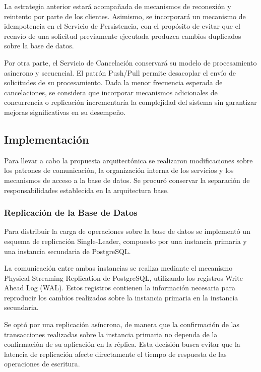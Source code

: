 \documentclass[conference]{IEEEtran}
\begin{document}
La estrategia anterior estará acompañada de mecanismos de reconexión y reintento 
por parte de los clientes. Asimismo, se incorporará un mecanismo de 
idempotencia en el Servicio de Persistencia, con el propósito de evitar 
que el reenvío de una solicitud previamente ejecutada produzca cambios 
duplicados sobre la base de datos.

Por otra parte, el Servicio de Cancelación conservará su modelo 
de procesamiento asíncrono y secuencial. El patrón Push/Pull 
permite desacoplar el envío de solicitudes de su procesamiento. 
Dada la menor frecuencia esperada de cancelaciones, se considera 
que incorporar mecanismos adicionales de concurrencia o replicación 
incrementaría la complejidad del sistema sin garantizar mejoras 
significativas en su desempeño.


\subsection{Implementación}

Para llevar a cabo la propuesta arquitectónica se realizaron modificaciones 
sobre los patrones de comunicación, la organización interna de los servicios 
y los mecanismos de acceso a la base de datos. Se procuró conservar la 
separación de responsabilidades establecida en la arquitectura base.

\subsubsection{Replicación de la Base de Datos}

Para distribuir la carga de operaciones sobre la base de datos se 
implementó un esquema de replicación Single-Leader, compuesto por una 
instancia primaria y una instancia secundaria de PostgreSQL.

La comunicación entre ambas instancias se realiza mediante el mecanismo 
Physical Streaming Replication de PostgreSQL, utilizando los registros 
Write-Ahead Log (WAL). Estos registros contienen la información necesaria 
para reproducir los cambios realizados sobre la instancia primaria en 
la instancia secundaria.

Se optó por una replicación asíncrona, de manera que la confirmación 
de las transacciones realizadas sobre la instancia primaria no dependa 
de la confirmación de su aplicación en la réplica. Esta decisión busca 
evitar que la latencia de replicación afecte directamente el tiempo de 
respuesta de las operaciones de escritura.
\end{document}
